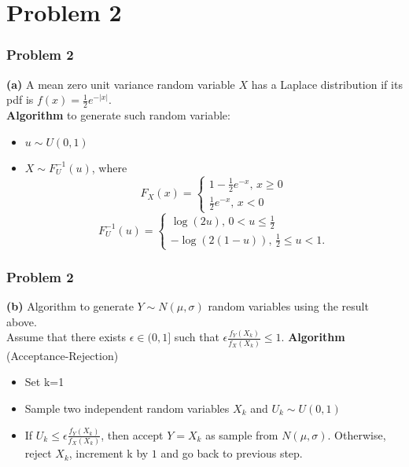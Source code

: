 \documentclass[10]{beamer}
\begin{document}
\frame{\titlepage}

\section{Problem 2}

\begin{frame}
\frametitle{Problem 2}
\textbf{(a)} A mean zero unit variance random variable $X$ has a Laplace distribution if its pdf is $f(x) = \frac{1}{2}  e^{-|x|}$.\\
\textbf{Algorithm} to generate such random variable:
\vspace{0.02in}
\begin{itemize}
\item $u \sim U(0,1)$
\item $ X \sim F_{U}^{-1}(u)$, where 
\begin{equation*}
 F_{X}(x) =
  \begin{cases}
   1 - \frac{1}{2} e^{-x},\, x \geq 0 \\
   \frac{1}{2} e^{-x},\,    x < 0
  \end{cases}
\end{equation*}
\begin{equation*}
 F^{-1}_{U}(u) =
  \begin{cases}
   \log{(2u)}, \,     0< u \leq \frac{1}{2} \\
   -\log{(2(1-u))} ,  \,  \frac{1}{2} \leq u < 1.
  \end{cases}
\end{equation*}
\end{itemize}
\end{frame}

\begin{frame}
\frametitle{Problem 2}
\textbf{(b)} Algorithm to generate $Y \sim N(\mu,\sigma)$ random variables using the result above.\\
Assume that there exists $\epsilon \in (0,1]$ such that $\epsilon \frac{f_{Y}(X_k)}{f_{X}(X_k)} \leq 1$.
\textbf{Algorithm} (Acceptance-Rejection)
\vspace{0.02in}
\begin{itemize}
\item Set k=1
\item Sample two independent random variables $X_k$ and $U_k \sim U(0,1)$
\item If $U_{k} \leq \epsilon \frac{f_{Y}(X_k)}{f_{X}(X_k)}$, then accept $Y = X_k$ as sample from $N(\mu,\sigma)$. Otherwise, reject $X_k$, increment k by $1$ and go back to previous step.
\end{itemize}
\end{frame}
\end{document}
